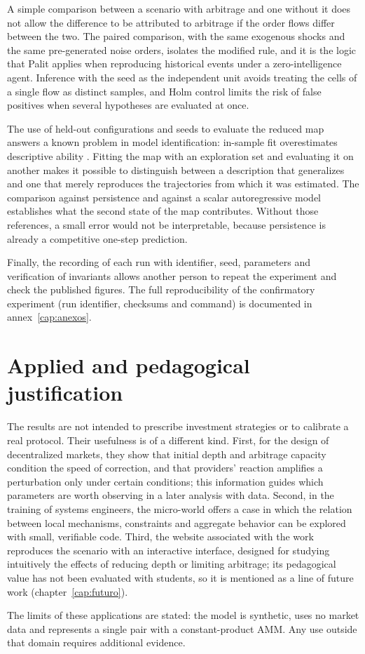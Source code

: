 A simple comparison between a scenario with arbitrage and one without it does not allow the difference to be attributed to arbitrage if the order flows differ between the two. The paired comparison, with the same exogenous shocks and the same pre-generated noise orders, isolates the modified rule, and it is the logic that Palit \cite{palit2022shuffled} applies when reproducing historical events under a zero-intelligence agent. Inference with the seed as the independent unit avoids treating the cells of a single flow as distinct samples, and Holm control limits the risk of false positives when several hypotheses are evaluated at once.

The use of held-out configurations and seeds to evaluate the reduced map answers a known problem in model identification: in-sample fit overestimates descriptive ability \cite{lamperti2018surrogates}. Fitting the map with an exploration set and evaluating it on another makes it possible to distinguish between a description that generalizes and one that merely reproduces the trajectories from which it was estimated. The comparison against persistence and against a scalar autoregressive model establishes what the second state of the map contributes. Without those references, a small error would not be interpretable, because persistence is already a competitive one-step prediction.

Finally, the recording of each run with identifier, seed, parameters and verification of invariants \cite{grimm2020odd,railsback2019agent} allows another person to repeat the experiment and check the published figures. The full reproducibility of the confirmatory experiment (run identifier, checksums and command) is documented in annex~\ref{cap:anexos}.

\section{Applied and pedagogical justification}

The results are not intended to prescribe investment strategies or to calibrate a real protocol. Their usefulness is of a different kind. First, for the design of decentralized markets, they show that initial depth and arbitrage capacity condition the speed of correction, and that providers' reaction amplifies a perturbation only under certain conditions; this information guides which parameters are worth observing in a later analysis with data. Second, in the training of systems engineers, the micro-world offers a case in which the relation between local mechanisms, constraints and aggregate behavior can be explored with small, verifiable code. Third, the website associated with the work reproduces the scenario with an interactive interface, designed for studying intuitively the effects of reducing depth or limiting arbitrage; its pedagogical value has not been evaluated with students, so it is mentioned as a line of future work (chapter~\ref{cap:futuro}).

The limits of these applications are stated: the model is synthetic, uses no market data and represents a single pair with a constant-product AMM. Any use outside that domain requires additional evidence.

